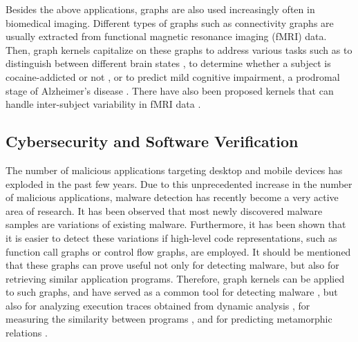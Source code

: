 \documentclass[twoside,11pt]{article}
\begin{document}
Besides the above applications, graphs are also used increasingly often in biomedical imaging.
Different types of graphs such as connectivity graphs are usually extracted from functional magnetic resonance imaging (fMRI) data.
Then, graph kernels capitalize on these graphs to address various tasks such as to distinguish between different brain states \cite{shahnazian2012method,mokhtari2013decoding,vega2013brain,vega2014classification}, to determine whether a subject is cocaine-addicted or not \cite{gkirtzou2016pyramid}, or to predict mild cognitive impairment, a prodromal stage of Alzheimer's disease \cite{jie2014topological,jie2016sub}.
There have also been proposed kernels that can handle inter-subject variability in fMRI data \cite{takerkart2014graph}.

\subsection{Cybersecurity and Software Verification}
The number of malicious applications targeting desktop and mobile devices has exploded in the past few years.
Due to this unprecedented increase in the number of malicious applications, malware detection has recently become a very active area of research.
It has been observed that most newly discovered malware samples are variations of existing malware. 
Furthermore, it has been shown that it is easier to detect these variations if high-level code representations, such as function call graphs or control flow graphs, are employed.
It should be mentioned that these graphs can prove useful not only for detecting malware, but also for retrieving similar application programs.
Therefore, graph kernels can be applied to such graphs, and have served as a common tool for detecting malware \cite{anderson2011graph,gascon2013structural,narayanan2016contextual}, but also for analyzing execution traces obtained from dynamic analysis \cite{wagner2009malware}, for measuring the similarity between programs \cite{li2016detecting}, and for predicting metamorphic relations \cite{kanewala2016predicting}.
\end{document}
